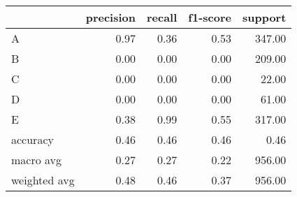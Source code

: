 \begin{tabular}{|l|r|r|r|r|}
\hline
{} &  precision &  recall &  f1-score &  support \\
\hline
A            &       0.97 &    0.36 &      0.53 &   347.00 \\
B            &       0.00 &    0.00 &      0.00 &   209.00 \\
C            &       0.00 &    0.00 &      0.00 &    22.00 \\
D            &       0.00 &    0.00 &      0.00 &    61.00 \\
E            &       0.38 &    0.99 &      0.55 &   317.00 \\
accuracy     &       0.46 &    0.46 &      0.46 &     0.46 \\
macro avg    &       0.27 &    0.27 &      0.22 &   956.00 \\
weighted avg &       0.48 &    0.46 &      0.37 &   956.00 \\
\hline
\end{tabular}
